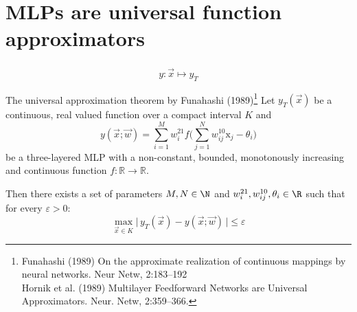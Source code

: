 \section{MLPs are universal function approximators}

\begin{frame}\frametitle{\secname}


\begin{equation}
y: \vec x \mapsto y_T
\end{equation}


   \begin{block}{The universal approximation theorem by Funahashi (1989)\footnote
	{
	 Funahashi (1989) On the approximate realization of 
		continuous mappings by neural networks. Neur Netw, 2:183--192\\
		Hornik et al. (1989) Multilayer Feedforward Networks 
		are Universal Approximators. Neur. Netw, 2:359--366.
		}}
	\small
    	Let $y_T{(\vec{x})}$ be a continuous, real valued function 
    	over a compact interval $K$ and     
		\begin{equation} 
		{y}{(\vec{x}; \vec w)} = \sum_{i=1}^M {w}_i^{21} 
		f\Big( \sum\limits_{j=1}^N {w}_{ij}^{10} 
		  \mathrm{x}_j - \theta_i \Big)
		 \end{equation}
    	be a three-layered MLP with a non-constant, bounded, 
    	monotonously increasing and continuous function 
    	$f: \mathbb{R} \rightarrow \mathbb{R}$.\\
		\vspace{4mm}
	   \pause

		Then there exists a set of parameters 
		$M, N \in \N$ and ${w}_i^{21}, 
		{w}_{ij}^{10}, \theta_i \in \R$ 
		such that for every $\varepsilon > 0$:
		\begin{equation}
			\max_{\vec{x} \in K} \Big| \, y_T{(\vec{x})} - {y}{(\vec{x}; \vec w)} \,\Big| 
			\leq \varepsilon
		 \end{equation}

  \end{block}
  
\end{frame}

